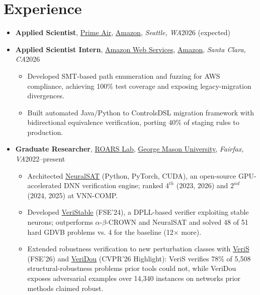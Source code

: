 \documentclass[11pt]{article}
\newcommand{\role}[4]{\item \textbf{#1}, #2, {\itshape #3}\hfill #4}
\begin{document}
\section{Experience}
    \begin{itemize}
        \role{Applied Scientist}{\href{https://www.primeair.amazon/}{Prime Air}, \href{https://www.amazon.com}{Amazon}}{Seattle, WA}{2026 (expected)}
        \role{Applied Scientist Intern}{\href{https://aws.amazon.com/}{Amazon Web Services}, \href{https://www.amazon.com}{Amazon}}{Santa Clara, CA}{2026}
            \begin{itemize}[before=\small,label=\textbullet]
                \item Developed SMT-based path enumeration and fuzzing for AWS compliance, achieving 100\% test coverage and exposing legacy-migration divergences.
                \item Built automated Java/Python to ControlsDSL migration framework with bidirectional equivalence verification, porting 40\% of staging rules to production.
            \end{itemize}
        \role{Graduate Researcher}{\href{https://roars.dev/}{ROARS Lab}, \href{https://www.gmu.edu}{George Mason University}}{Fairfax, VA}{2022--present}
            \begin{itemize}[before=\small,label=\textbullet]
                \item Architected \href{https://github.com/dynaroars/neuralsat}{NeuralSAT} (Python, PyTorch, CUDA), an open-source GPU-accelerated DNN verification engine; ranked $4^{th}$ (2023, 2026) and $2^{nd}$ (2024, 2025) at VNN-COMP.
                \item Developed \href{https://github.com/veristable/veristable}{VeriStable} (FSE'24), a DPLL-based verifier exploiting stable neurons; outperforms $\alpha$-$\beta$-CROWN and NeuralSAT and solved 48 of 51 hard GDVB problems vs. 4 for the baseline (12$\times$ more).
                \item Extended robustness verification to new perturbation classes with \href{https://github.com/dynaroars/VeriS}{VeriS} (FSE'26) and \href{https://github.com/dynaroars/VeriDou}{VeriDou} (CVPR'26 Highlight): VeriS verifies 78\% of 5{,}508 structural-robustness problems prior tools could not, while VeriDou exposes adversarial examples over 14{,}340 instances on networks prior methods claimed robust.

\end{itemize}
\end{itemize}
\end{document}
